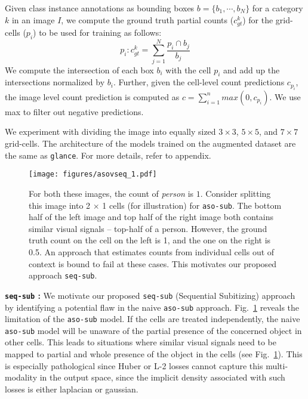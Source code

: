 \documentclass[10pt,twocolumn,letterpaper]{article}
\newcommand{\sub}{\texttt{aso-sub}\xspace}
\newcommand{\seq}{\texttt{seq-sub}\xspace}
\newcommand{\glance}{\texttt{glance}\xspace}
\begin{document}
Given class instance annotations as bounding boxes  $b = \{b_{1},\cdots,b_{N}\}$ for a category $k$ in an image $I$, we compute the ground truth partial counts ($c_{gt}^k$) for the grid-cells ($p_{i}$) to be used for training as follows: 
\begin{equation}
p_{i}: c_{gt}^k = \sum_{j=1}^{N} \frac{p_{i} \cap b_{j}}{b_{j}} 
\end{equation}
We compute the intersection of each box $b_{i}$ with the cell $p_{i}$ and add up the intersections normalized by $b_{i}$.
Further, given the cell-level count predictions $c_{p_i}$, the image level count prediction is computed as $c=\sum_{i=1}^nmax(0,c_{p_i})$. We use max to filter out negative predictions. 


We experiment with dividing the image into equally sized $3\times3$, $5\times5$, and $7\times7$ grid-cells. The architecture of the models trained on the augmented dataset are the same as \glance. For more details, refer to appendix.
\begin{figure}[t]
\texttt{[image: figures/asovseq\_1.pdf]}
\vspace{-15pt}
\caption{\footnotesize{For both these images, the count of \emph{person} is $1$. Consider splitting this image into 2 $\times$ 1 cells (for illustration) for \sub. The bottom half of the left image and top half of the right image both contains similar visual signals -- top-half of a person. However, the ground truth count on the cell on the left is 1, and the one on the right is 0.5. An approach that estimates counts from individual cells out of context is bound to fail at these cases. This motivates our proposed approach \seq. 
}}
\label{fig:asoproblem}
\vspace{-17pt}
\end{figure}

\par \noindent
\textbf{\seq{} :} We motivate our proposed \seq{} (Sequential Subitizing) approach by identifying a potential flaw in the naive \sub{} approach. Fig.~\ref{fig:asoproblem} reveals the limitation of the \sub{} model.
If the cells are treated independently, the naive \sub model will be unaware of the partial presence of the concerned object in other cells. This leads to situations where similar visual signals need to be mapped to partial and whole presence of the object in the cells (see Fig.~\ref{fig:asoproblem}). This is especially pathological since Huber or L-2 losses cannot capture this multi-modality in the output space, since the implicit density associated with such losses is either laplacian or gaussian.
\end{document}
